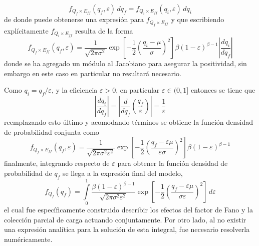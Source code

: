 \begin{equation*}
    f_{Q_{f}\times E_{ff}}(q_{f}, \varepsilon)\,dq_{f} =
    f_{Q_{i}\times E_{ff}}(q_{i}, \varepsilon)\,dq_{i}
\end{equation*}
de donde puede obtenerse una expresión para $f_{Q_{f}\times E_{ff}}$ y que escribiendo explícitamente $f_{Q_{i}\times E_{ff}}$ resulta de la forma
\begin{equation*}
    f_{Q_{f}\times E_{ff}}(q_{f}, \varepsilon)
    = 
    \frac{1}{\sqrt{2\pi \sigma^{2}}}
    \exp
        \left[
            -\frac{1}{2}
            \left(
                \frac{q_{i} - \mu}{\sigma}
            \right)^{2}
        \right]
    \beta(1-\varepsilon)^{\beta - 1}
    \left|
        \frac{dq_{i}}{dq_{f}}
    \right|
\end{equation*}
donde se ha agregado un módulo al Jacobiano para asegurar la positividad, sin embargo en este caso en particular no resultará necesario. 

Como $q_{i} = q_{f}/\varepsilon$, y la eficiencia $\varepsilon > 0$, en particular $\varepsilon \in (0, 1]$ entonces se tiene que 
\begin{equation*}
    \left|
        \frac{dq_{i}}{dq_{f}}
    \right|
        = 
    \left|
        \frac{d}{dq_{f}}
        \left(
            \frac{q_{f}}{\varepsilon}
        \right)
    \right|
        = 
        \frac{1}{\varepsilon}
\end{equation*}
reemplazando esto último y acomodando términos se obtiene la función densidad de probabilidad conjunta como
\begin{equation*}
    f_{Q_{f}\times E_{ff}}(q_{f}, \varepsilon)
    = 
    \frac{1}{\sqrt{2\pi \sigma^{2}\varepsilon^{2}}}
    \exp
        \left[
            -\frac{1}{2}
            \left(
                \frac{q_{f} - \varepsilon\mu}{\varepsilon\sigma}
            \right)^{2}
        \right]
    \beta(1-\varepsilon)^{\beta - 1}
\end{equation*}
finalmente, integrando respecto de $\varepsilon$ para obtener la función densidad de probabilidad de $q_{f}$ se llega a la expresión final del modelo,
\begin{equation}
    f_{Q_{f}}(q_{f}) = 
    \int\limits_{0}^{1}
    \frac{\beta(1-\varepsilon)^{\beta - 1}}{\sqrt{2\pi \sigma^{2}\varepsilon^{2}}}
    \exp
        \left[
            -\frac{1}{2}
            \left(
                \frac{q_{f} - \varepsilon\mu}{\sigma\varepsilon}
            \right)^{2}
        \right]\,
    d\varepsilon
    \label{ec:DistribucionFinal}
\end{equation}
el cual fue específicamente construido describir los efectos del factor de Fano y la colección parcial de carga actuando conjuntamente. Por otro lado, al no existir una expresión analítica para la solución de esta integral, fue necesario resolverla numéricamente.

